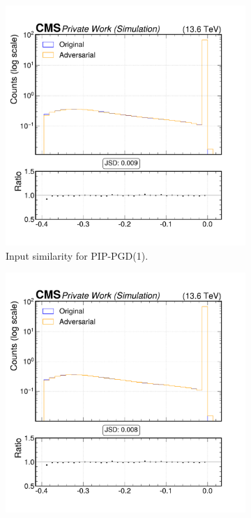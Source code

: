 \begin{figure}[htbp]
  \centering
  \begin{subfigure}[t]{0.32\textwidth}
    \includegraphics[width=\linewidth]{media/output/features/compare/combined_it_1/cmp_npf_arr_Npfcan_drminsv.pdf}
    \caption*{Input similarity for PIP-PGD(1).}
  \end{subfigure}\hfill
  \begin{subfigure}[t]{0.32\textwidth}
    \includegraphics[width=\linewidth]{media/output/features/compare/combined_it_2/cmp_npf_arr_Npfcan_drminsv.pdf}

\end{subfigure}
\end{figure}
